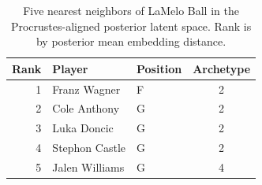 \begin{table}[htbp]
  \centering\small
  \begin{tabular}{rllc}
    \toprule
    Rank & Player & Position & Archetype \\
    \midrule
    1 & Franz Wagner & F & 2 \\
    2 & Cole Anthony & G & 2 \\
    3 & Luka Doncic & G & 2 \\
    4 & Stephon Castle & G & 2 \\
    5 & Jalen Williams & G & 4 \\
    \bottomrule
  \end{tabular}
  \caption{Five nearest neighbors of LaMelo Ball in the Procrustes-aligned posterior latent space. Rank is by posterior mean embedding distance.}
  \label{tab:LaMelo_Ball_neighbors}
\end{table}

